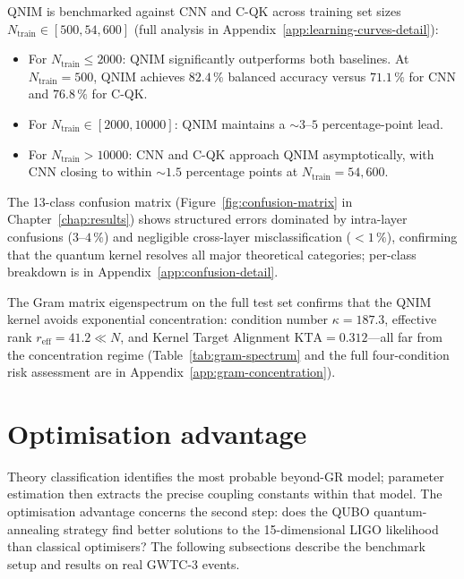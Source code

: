 \documentclass[11pt,a4paper, english]{book}
\theoremstyle{plain}
\theoremstyle{definition}
\numberwithin{equation}{chapter}
\numberwithin{figure}{chapter}
\numberwithin{table}{chapter}
\begin{document}
QNIM is benchmarked against CNN and C-QK across training set sizes $N_\mathrm{train} \in [500, 54{,}600]$ (full analysis in Appendix~\ref{app:learning-curves-detail}):
\begin{itemize}
  \item For $N_\mathrm{train} \leq 2000$: QNIM significantly
        outperforms both baselines.  At $N_\mathrm{train} = 500$, QNIM
        achieves $82.4\,\%$ balanced accuracy versus $71.1\,\%$ for CNN
        and $76.8\,\%$ for C-QK.

  \item For $N_\mathrm{train} \in [2000, 10000]$: QNIM maintains a
        $\sim\!3$--$5$ percentage-point lead.

  \item For $N_\mathrm{train} > 10000$: CNN and C-QK approach QNIM
        asymptotically, with CNN closing to within $\sim\!1.5$ percentage
        points at $N_\mathrm{train} = 54{,}600$.
\end{itemize}

The 13-class confusion matrix (Figure~\ref{fig:confusion-matrix} in 
Chapter~\ref{chap:results}) shows structured errors dominated by intra-layer confusions ($3$--$4\,\%$) and negligible cross-layer misclassification ($< 1\,\%$), confirming that the quantum kernel resolves all major theoretical categories; per-class breakdown is in Appendix~\ref{app:confusion-detail}.

\label{subsec:gram-concentration}%
The Gram matrix eigenspectrum on the full test set confirms that the QNIM kernel avoids exponential concentration: condition number $\kappa = 187.3$, effective rank $r_\mathrm{eff} = 41.2 \ll N$, and Kernel Target Alignment $\mathrm{KTA} = 0.312$---all far from the concentration regime (Table~\ref{tab:gram-spectrum} and the full four-condition risk assessment are in Appendix~\ref{app:gram-concentration}).

\section{Optimisation advantage}
\label{sec:optim-advantage}

Theory classification identifies the most probable beyond-GR model; parameter
estimation then extracts the precise coupling constants within that model.
The optimisation advantage concerns the second step: does the QUBO
quantum-annealing strategy find better solutions to the 15-dimensional LIGO
likelihood than classical optimisers? The following subsections describe the
benchmark setup and results on real GWTC-3 events.
\end{document}
